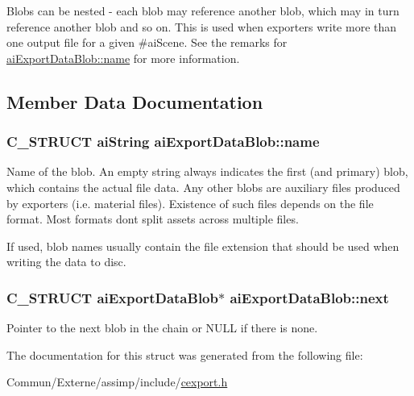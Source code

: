 Blobs can be nested -\/ each blob may reference another blob, which may in turn reference another blob and so on. This is used when exporters write more than one output file for a given \#ai\+Scene. See the remarks for \hyperlink{structai_export_data_blob_af7f006ac5ad818c0d81d520a84f74c3e}{ai\+Export\+Data\+Blob\+::name} for more information. 

\subsection{Member Data Documentation}
\subsubsection[{\texorpdfstring{name}{name}}]{\setlength{\rightskip}{0pt plus 5cm}C\+\_\+\+S\+T\+R\+U\+CT {\bf ai\+String} ai\+Export\+Data\+Blob\+::name}\hypertarget{structai_export_data_blob_af7f006ac5ad818c0d81d520a84f74c3e}{}\label{structai_export_data_blob_af7f006ac5ad818c0d81d520a84f74c3e}
Name of the blob. An empty string always indicates the first (and primary) blob, which contains the actual file data. Any other blobs are auxiliary files produced by exporters (i.\+e. material files). Existence of such files depends on the file format. Most formats don\textquotesingle{}t split assets across multiple files.

If used, blob names usually contain the file extension that should be used when writing the data to disc. 
\subsubsection[{\texorpdfstring{next}{next}}]{\setlength{\rightskip}{0pt plus 5cm}C\+\_\+\+S\+T\+R\+U\+CT {\bf ai\+Export\+Data\+Blob}$\ast$ ai\+Export\+Data\+Blob\+::next}\hypertarget{structai_export_data_blob_a3e98fa760f45983ff1bccec6715f3817}{}\label{structai_export_data_blob_a3e98fa760f45983ff1bccec6715f3817}
Pointer to the next blob in the chain or N\+U\+LL if there is none. 

The documentation for this struct was generated from the following file\+:\begin{DoxyCompactItemize}
\item 
Commun/\+Externe/assimp/include/\hyperlink{cexport_8h}{cexport.\+h}\end{DoxyCompactItemize}
